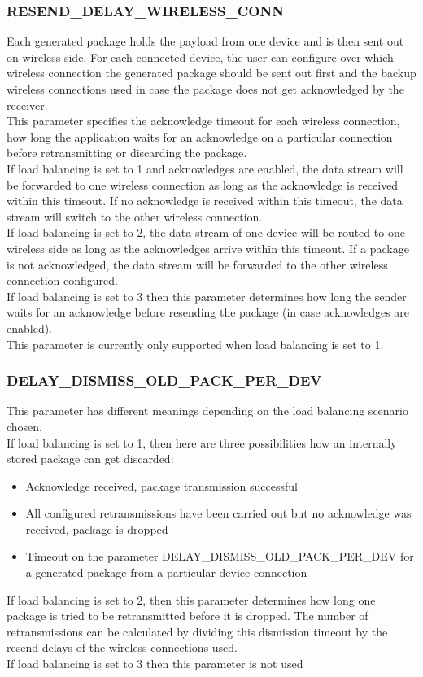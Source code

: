 \subsubsection{RESEND\_DELAY\_WIRELESS\_CONN}
Each generated package holds the payload from one device and is then sent out on wireless side. For each connected device, the user can configure over which wireless connection the generated package should be sent out first and the backup wireless connections used in case the package does not get acknowledged by the receiver.\\
This parameter specifies the acknowledge timeout for each wireless connection, how long the application waits for an acknowledge on a particular connection before retransmitting or discarding the package.\\
If load balancing is set to 1 and acknowledges are enabled, the data stream will be forwarded to one wireless connection as long as the acknowledge is received within this timeout. If no acknowledge is received within this timeout, the data stream will switch to the other wireless connection.\\
If load balancing is set to 2, the data stream of one device will be routed to one wireless side as long as the acknowledges arrive within this timeout. If a package is not acknowledged, the data stream will be forwarded to the other wireless connection configured.\\
If load balancing is set to 3 then this parameter determines how long the sender waits for an acknowledge before resending the package (in case acknowledges are enabled).\\
This parameter is currently only supported when load balancing is set to 1.

%
\subsubsection{DELAY\_DISMISS\_OLD\_PACK\_PER\_DEV}
This parameter has different meanings depending on the load balancing scenario chosen.\\
If load balancing is set to 1, then here are three possibilities how an internally stored package can get discarded:
\begin{itemize}
    \item Acknowledge received, package transmission successful
    \item All configured retransmissions have been carried out but no acknowledge was received, package is dropped
    \item Timeout on the parameter DELAY\_DISMISS\_OLD\_PACK\_PER\_DEV for a generated package from a particular device connection
\end{itemize}
If load balancing is set to 2, then this parameter determines how long one package is tried to be retransmitted before it is dropped. The number of retransmissions can be calculated by dividing this dismission timeout by the resend delays of the wireless connections used.\\
If load balancing is set to 3 then this parameter is not used
%
